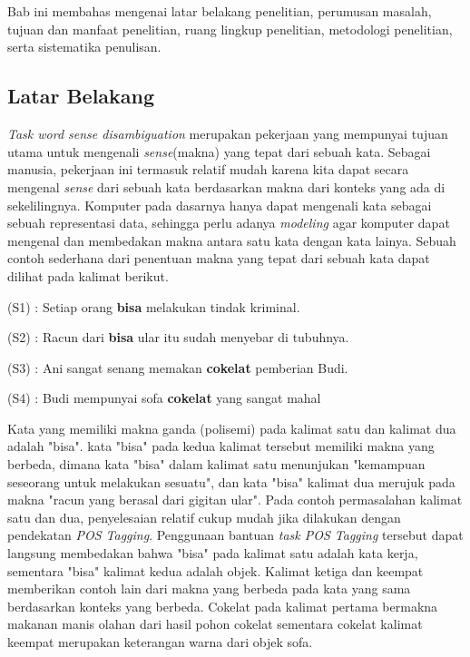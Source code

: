 \chapter{\babSatu}
Bab ini membahas mengenai latar belakang penelitian, perumusan masalah, tujuan dan manfaat penelitian, ruang lingkup penelitian, metodologi penelitian, serta sistematika penulisan.

\section{Latar Belakang}

\textit{Task word sense disambiguation} merupakan pekerjaan yang mempunyai tujuan utama untuk mengenali \textit{sense}(makna) yang tepat dari sebuah kata. Sebagai manusia, pekerjaan ini termasuk relatif mudah karena kita dapat secara mengenal \textit{sense} dari sebuah kata berdasarkan makna dari konteks yang ada di sekelilingnya. Komputer pada dasarnya hanya dapat mengenali kata sebagai sebuah representasi data, sehingga perlu adanya \textit{modeling} agar komputer dapat mengenal dan membedakan makna antara satu kata dengan kata lainya. Sebuah contoh sederhana dari penentuan makna yang tepat dari sebuah kata dapat dilihat pada kalimat berikut.

(S1) : Setiap orang \textbf{bisa} melakukan tindak kriminal.

(S2) : Racun dari \textbf{bisa} ular itu sudah menyebar di tubuhnya.

(S3) : Ani sangat senang memakan \textbf{cokelat} pemberian Budi.

(S4) : Budi mempunyai sofa \textbf{cokelat} yang sangat mahal

Kata yang memiliki makna ganda (polisemi) pada kalimat satu dan kalimat dua adalah "bisa". kata "bisa" pada kedua kalimat tersebut memiliki makna yang berbeda, dimana kata "bisa" dalam kalimat satu menunjukan "kemampuan seseorang untuk melakukan sesuatu", dan kata "bisa" kalimat dua merujuk pada makna "racun yang berasal dari gigitan ular". Pada contoh permasalahan kalimat satu dan dua, penyelesaian relatif cukup mudah jika dilakukan dengan pendekatan \textit{POS Tagging}. Penggunaan bantuan \textit{task POS Tagging} tersebut dapat langsung membedakan bahwa "bisa" pada kalimat satu adalah kata kerja, sementara "bisa" kalimat kedua adalah objek. Kalimat ketiga dan keempat memberikan contoh lain dari makna yang berbeda pada kata yang sama berdasarkan konteks yang berbeda. Cokelat pada kalimat pertama bermakna makanan manis olahan dari hasil pohon cokelat sementara cokelat kalimat keempat merupakan keterangan warna dari objek sofa.

